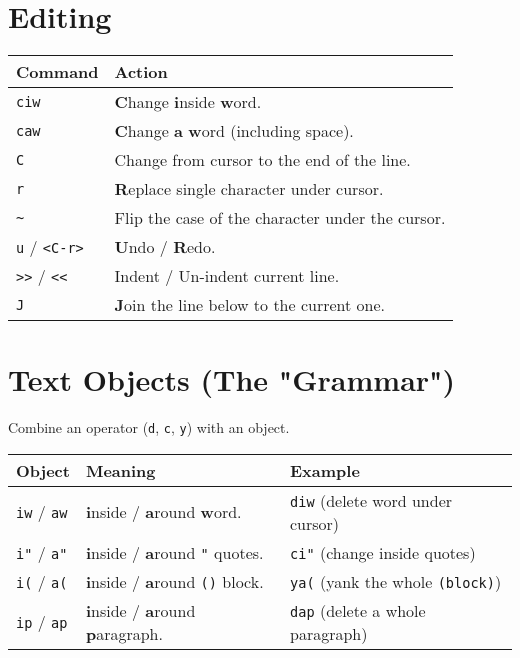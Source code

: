 \documentclass[10pt, a4paper]{article}
\newcommand{\key}[1]{\texttt{#1}}
\begin{document}
\section*{Editing}
\begin{tabularx}{\textwidth}{lX}
    \hline
    \textbf{Command} & \textbf{Action} \\
    \hline
    \key{ciw} & \textbf{C}hange \textbf{i}nside \textbf{w}ord. \\
    \key{caw} & \textbf{C}hange \textbf{a} \textbf{w}ord (including space). \\
    \key{C} & Change from cursor to the end of the line. \\
    \key{r} & \textbf{R}eplace single character under cursor. \\
    \key{\textasciitilde} & Flip the case of the character under the cursor. \\
    \key{u} / \key{<C-r>} & \textbf{U}ndo / \textbf{R}edo. \\
    \key{>>} / \key{<<} & Indent / Un-indent current line. \\
    \key{J} & \textbf{J}oin the line below to the current one. \\
    \hline
\end{tabularx}

\section*{Text Objects (The "Grammar")}
Combine an operator (\key{d}, \key{c}, \key{y}) with an object.
\begin{tabularx}{\textwidth}{lXl}
    \hline
    \textbf{Object} & \textbf{Meaning} & \textbf{Example} \\
    \hline
    \key{iw} / \key{aw} & \textbf{i}nside / \textbf{a}round \textbf{w}ord. & \key{diw} (delete word under cursor) \\
    \key{i"} / \key{a"} & \textbf{i}nside / \textbf{a}round \key{"} quotes. & \key{ci"} (change inside quotes) \\
    \key{i(} / \key{a(} & \textbf{i}nside / \textbf{a}round \key{()} block. & \key{ya(} (yank the whole \key{(block)}) \\
    \key{ip} / \key{ap} & \textbf{i}nside / \textbf{a}round \textbf{p}aragraph. & \key{dap} (delete a whole paragraph) \\
    \hline
\end{tabularx}

\end{document}
